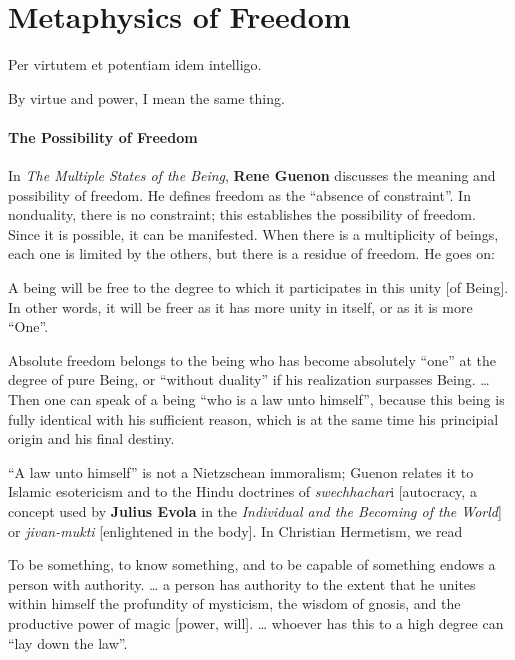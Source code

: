\section{Metaphysics of Freedom}

\begin{quotex}
Per virtutem et potentiam idem intelligo.

By virtue and power, I mean the same thing.


\end{quotex}
\paragraph{The Possibility of Freedom}
In \emph{The Multiple States of the Being}, \textbf{Rene Guenon} discusses the meaning and possibility of freedom. He defines freedom as the “absence of constraint”. In nonduality, there is no constraint; this establishes the possibility of freedom. Since it is possible, it can be manifested. When there is a multiplicity of beings, each one is limited by the others, but there is a residue of freedom. He goes on:

\begin{quotex}
A being will be free to the degree to which it participates in this unity [of Being]. In other words, it will be freer as it has more unity in itself, or as it is more “One”.

Absolute freedom belongs to the being who has become absolutely “one” at the degree of pure Being, or “without duality” if his realization surpasses Being. … Then one can speak of a being “who is a law unto himself”, because this being is fully identical with his sufficient reason, which is at the same time his principial origin and his final destiny. 

\end{quotex}
“A law unto himself” is not a Nietzschean immoralism; Guenon relates it to Islamic esotericism and to the Hindu doctrines of \emph{swechhachar}i [autocracy, a concept used by \textbf{Julius Evola} in the \emph{Individual and the Becoming of the World}] or \emph{jivan-mukti} [enlightened in the body]. In Christian Hermetism, we read

\begin{quotex}
To be something, to know something, and to be capable of something endows a person with authority. … a person has authority to the extent that he unites within himself the profundity of mysticism, the wisdom of gnosis, and the productive power of magic [power, will]. … whoever has this to a high degree can “lay down the law”. 

\end{quotex}


